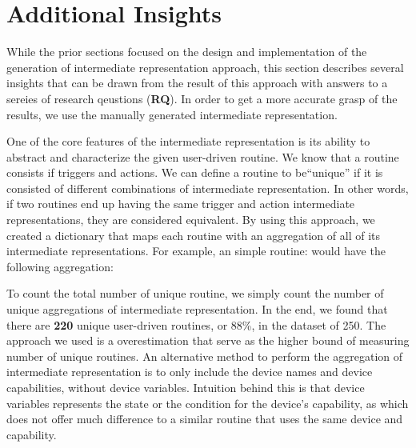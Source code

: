 \section{Additional Insights}
\label{sec:insight} 



While the prior sections focused on the design and implementation of the generation of intermediate representation approach, this section describes several insights that can be drawn from the result of this approach with answers to a sereies of research qeustions (\textbf{RQ}). In order to get a more accurate grasp of the results, we use the manually generated intermediate representation.


One of the core features of the intermediate representation is its ability to abstract and characterize the given user-driven routine. We know that a routine consists if triggers and actions. We can  define a routine to be``unique'' if it is consisted of different combinations of intermediate representation. In other words, if two routines end up having the same trigger and action intermediate representations, they are considered equivalent. By using this approach, we created a dictionary that maps each routine with an aggregation of all of its intermediate representations. For example, an simple routine:   
\noindent{}
would have the following aggregation: 
\noindent{}

To count the total number of unique routine, we simply count the number of unique aggregations of intermediate representation. In the end, we found that there are \textbf{220} unique user-driven routines, or 88\%, in the dataset of 250. The approach we used is a overestimation that serve as the higher bound of measuring number of unique routines. An alternative method to perform the aggregation of intermediate representation is to only include the device names and device capabilities, without device variables. Intuition behind this is that device variables represents the state or the condition for the device's capability, as which does not offer much difference to a similar routine that uses the same device and capability. 


